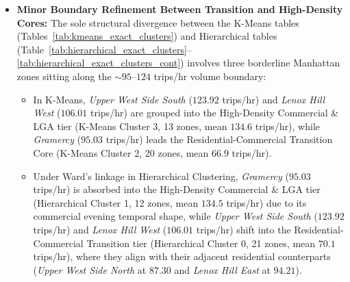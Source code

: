 \documentclass[11pt,a4paper]{article}
\begin{document}
\begin{itemize}
    \item \textbf{Minor Boundary Refinement Between Transition and High-Density Cores:} The sole structural divergence between the K-Means tables (Tables~\ref{tab:kmeans_exact_clusters}) and Hierarchical tables (Table~\ref{tab:hierarchical_exact_clusters}--\ref{tab:hierarchical_exact_clusters_cont}) involves three borderline Manhattan zones sitting along the $\sim 95$--$124$ trips/hr volume boundary:
    \begin{itemize}
        \item In K-Means, \textit{Upper West Side South} ($123.92$ trips/hr) and \textit{Lenox Hill West} ($106.01$ trips/hr) are grouped into the High-Density Commercial \& LGA tier (K-Means Cluster 3, 13 zones, mean $134.6$ trips/hr), while \textit{Gramercy} ($95.03$ trips/hr) leads the Residential-Commercial Transition Core (K-Means Cluster 2, 20 zones, mean $66.9$ trips/hr).
        \item Under Ward's linkage in Hierarchical Clustering, \textit{Gramercy} ($95.03$ trips/hr) is absorbed into the High-Density Commercial \& LGA tier (Hierarchical Cluster 1, 12 zones, mean $134.5$ trips/hr) due to its commercial evening temporal shape, while \textit{Upper West Side South} ($123.92$ trips/hr) and \textit{Lenox Hill West} ($106.01$ trips/hr) shift into the Residential-Commercial Transition tier (Hierarchical Cluster 0, 21 zones, mean $70.1$ trips/hr), where they align with their adjacent residential counterparts (\textit{Upper West Side North} at $87.30$ and \textit{Lenox Hill East} at $94.21$).
    \end{itemize}
\end{itemize}
\end{document}
